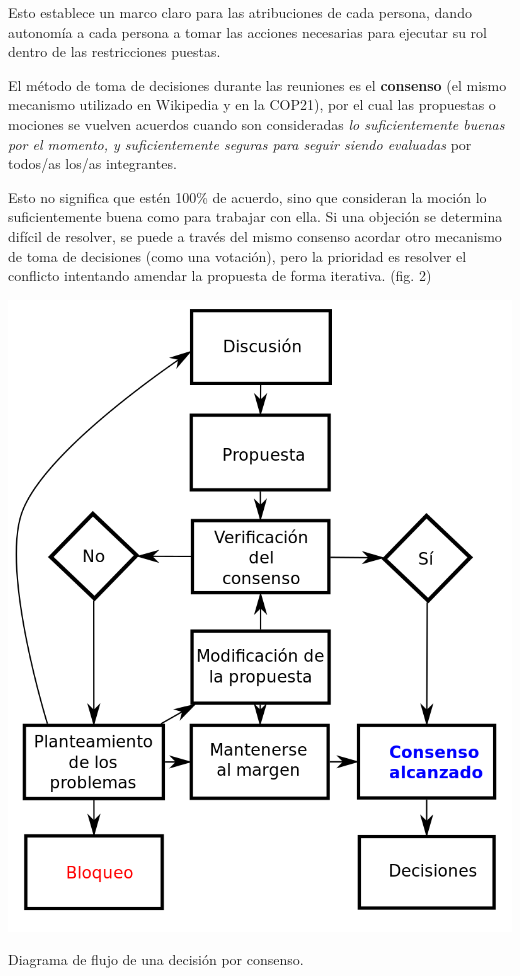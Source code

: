 \documentclass[justified]{tufte-handout} %
\begin{document}
Esto establece un marco claro para las atribuciones de cada persona, dando autonomía a cada persona a tomar las acciones necesarias para ejecutar su rol dentro de las restricciones puestas.

El método de toma de decisiones durante las reuniones es el \textbf{consenso} (el mismo mecanismo utilizado en Wikipedia y en la COP21), por el cual las propuestas o mociones se vuelven acuerdos cuando son consideradas \textit{lo suficientemente buenas por el momento, y suficientemente seguras para seguir
siendo evaluadas} por todos/as los/as integrantes. 

Esto no significa que estén 100\% de acuerdo, sino que consideran la moción lo suficientemente buena como para trabajar con ella. Si una objeción se determina difícil de resolver, se puede a través del mismo consenso acordar otro mecanismo de toma de decisiones (como una votación), pero la prioridad es resolver el conflicto intentando amendar la propuesta de forma iterativa. (fig. 2)
\begin{marginfigure}[-300px]
	\includegraphics[width=\linewidth]{consenso.png}
	\caption{Diagrama de flujo de una decisión por consenso.}
	\label{fig:consenso}
\end{marginfigure}
\end{document}
